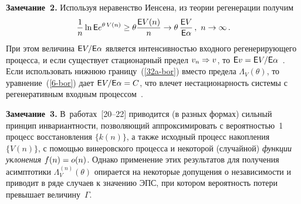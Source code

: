 \begin{multicols}{2}
\medskip

\noindent
\textbf{Замечание~2.}  Используя  неравенство Иенсена, из теории регенерации  получим
\begin{equation}
\displaystyle\frac{\displaystyle 1\mathstrut}{\displaystyle n\mathstrut}\ln {\sf E} e^{\theta\, V(n)}\ge \theta\displaystyle\frac{\displaystyle {\sf E} V(n)\mathstrut}{\displaystyle n\mathstrut}\to
\theta \,\displaystyle\frac{\displaystyle {\sf E} V\mathstrut}{\displaystyle {\sf E}\alpha\mathstrut}\,,\ n\to \infty\,. \label{32a-bor}
\end{equation}
При этом величина  $ {\sf E} V/{\sf E} \alpha $ является ин\-тен\-сив\-ностью
входного регенерирующего процесса, и если существует стационарный
предел $v_n\hm\Rightarrow v$, то $\e v\hm=\e V/\e \alpha$~\cite{Asmus}.
 Если  использовать  нижнюю
границу~(\ref{32a-bor}) вместо  предела $\Lambda_V(\theta)$, то
 уравнение~(\ref{6-bor})
дает   $\e V/\e \alpha\hm=C$, что  влечет нестационарность сис\-те\-мы с
регенеративным входным процессом~\cite{Questa04}.


\medskip

\noindent
\textbf{Замечание~3.}  В~работах~[20--22]
приводится (в разных формах) сильный принцип инвариантности,
позволяющий аппроксимировать с вероятностью~1 процесс восстановления
$\{k(n)\}$, а также  исходный процесс накопления $\{V(n)\}$, с
помощью винеровского процесса и некоторой (случайной) {\it функции
уклонения}  $f(n)\hm=o( n)$. Однако  применение этих результатов для
получения асимптотики $\Lambda_V^{(n)}(\theta)$ опирается на
некоторые допущения о независимости и приводит в ряде случаев к
значению ЭПС, при котором   вероятность потери превышает величину~$\Gamma$.

\begin{table*}[b]\small
\vspace*{-12pt}
\begin{center}
\vspace*{2ex}



\end{center}
\end{table*}
\end{multicols}
